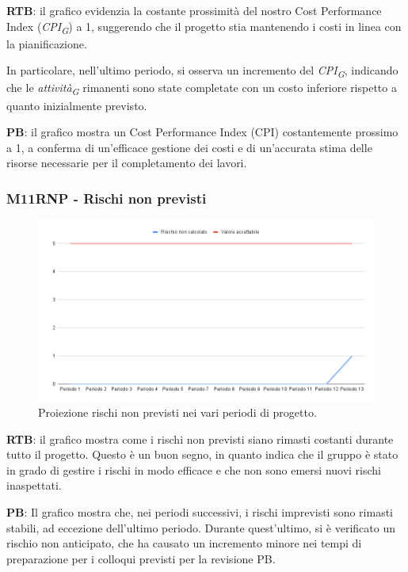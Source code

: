 \vspace{0.2cm}

\textbf{RTB}: il grafico evidenzia la costante prossimità del nostro Cost Performance Index (\textit{CPI}\textsubscript{\textit{G}}) a 1, suggerendo che il progetto stia mantenendo i costi in linea con la pianificazione.

\vspace{0.2cm}

In particolare, nell'ultimo periodo, si osserva un incremento del \textit{CPI}\textsubscript{\textit{G}}, indicando che le \textit{attività}\textsubscript{\textit{G}} rimanenti sono state completate con un costo inferiore rispetto a quanto inizialmente previsto.

\vspace{0.2cm}
\textbf{PB}: il grafico mostra un Cost Performance Index (CPI) costantemente prossimo a 1, a conferma di un'efficace gestione dei costi e di un'accurata stima delle risorse necessarie per il completamento dei lavori.

\subsubsection{M11RNP - Rischi non previsti}

\vspace{0.3cm}

\begin{figure}[H]
    \centering
    \includegraphics[width=1\textwidth]{../Images/PianoDiQualifica/M11RNP.png}
    \caption{Proiezione rischi non previsti nei vari periodi di progetto.}
    \label{fig:7}
\end{figure}

\vspace{0.2cm}

\textbf{RTB}: il grafico mostra come i rischi non previsti siano rimasti costanti durante tutto il progetto. Questo è un buon segno, in quanto indica che il gruppo è stato in grado di gestire i rischi in modo efficace e che non sono emersi nuovi rischi inaspettati.

\vspace{0.2cm}
\textbf{PB}: Il grafico mostra che, nei periodi successivi, i rischi imprevisti sono rimasti stabili, ad eccezione dell’ultimo periodo. Durante quest’ultimo, si è verificato un rischio non anticipato, che ha causato un incremento minore nei tempi di preparazione per i colloqui previsti per la revisione PB.

